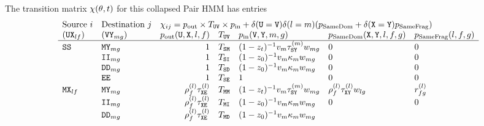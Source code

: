 The transition matrix $\chi(\theta,t)$ for this collapsed Pair HMM has entries
\begin{equation}
\begin{array}{llrclll}
\mbox{Source}\ i & \mbox{Destination}\ j & \multicolumn{5}{l}{\transnest_{ij} = \domexit \times \nonemptytrans_{\ustate\vstate} \times \domenter + \delta(\ustate=\vstate) \samedom (p_\text{SameDom} + \delta(\xstate=\ystate) p_\text{SameFrag})} \\
\left( \ustate\xstate_{\srcdom\srcfrag} \right) &
\left( \vstate\ystate_{\destdom\destfrag} \right) &
\domexit(\ustate,\xstate,\srcdom,\srcfrag) & \nonemptytrans_{\ustate\vstate} & \domenter(\vstate,\ystate,\destdom,\destfrag) & p_\text{SameDom}(\xstate,\ystate,\srcdom,\srcfrag,\destfrag) & p_\text{SameFrag}(\srcdom,\srcfrag,\destfrag) \\
\hline
\sta\sta & \mat\ystate_{\destdom\destfrag} &
1 & \nonemptytrans_{\sta\mat}
& (1 - \emptyseg_\evoltime)^{-1} \domdist_\destdom
\tkftrans_{\sta\ystate}^{(\destdom)}
\fragdist_{\destdom\destfrag}
& 0 & 0 \\
& \ins\ins_{\destdom\destfrag} &
1 & \nonemptytrans_{\sta\ins} &
(1 - \emptyseg_0)^{-1} \domdist_\destdom
\kappa_\destdom
\fragdist_{\destdom\destfrag}
& 0 & 0 \\
& \del\del_{\destdom\destfrag} &
1 & \nonemptytrans_{\sta\del} &
(1 - \emptyseg_0)^{-1} \domdist_\destdom
\kappa_\destdom
\fragdist_{\destdom\destfrag}
& 0 & 0 \\
  & \fin\fin &
1 & \nonemptytrans_{\sta\fin} &
1 & 0 & 0  \\
\mat\xstate_{\srcdom\srcfrag} & \mat\ystate_{\destdom\destfrag} &
\notext^{(\srcdom)}_\srcfrag
\tkftrans_{\xstate\fin}^{(\srcdom)}
& \nonemptytrans_{\mat\mat} &
(1 - \emptyseg_\evoltime)^{-1} \domdist_\destdom
\tkftrans_{\sta\ystate}^{(\destdom)}
\fragdist_{\destdom\destfrag}
& \notext^{(\srcdom)}_\srcfrag \tkftrans_{\xstate\ystate}^{(\srcdom)} \fragdist_{\srcdom\destfrag}
& \ext^{(\srcdom)}_{\srcfrag\destfrag}
\\
  & \ins\ins_{\destdom\destfrag} & \notext^{(\srcdom)}_\srcfrag
\tkftrans_{\xstate\fin}^{(\srcdom)}
& \nonemptytrans_{\mat\ins} &
(1 - \emptyseg_0)^{-1} \domdist_\destdom
\kappa_\destdom
\fragdist_{\destdom\destfrag}
 & 0 & 0 \\
  & \del\del_{\destdom\destfrag} & \notext^{(\srcdom)}_\srcfrag
\tkftrans_{\xstate\fin}^{(\srcdom)}
& \nonemptytrans_{\mat\del} &
(1 - \emptyseg_0)^{-1} \domdist_\destdom
\kappa_\destdom
\fragdist_{\destdom\destfrag}

\end{array}
\end{equation}
